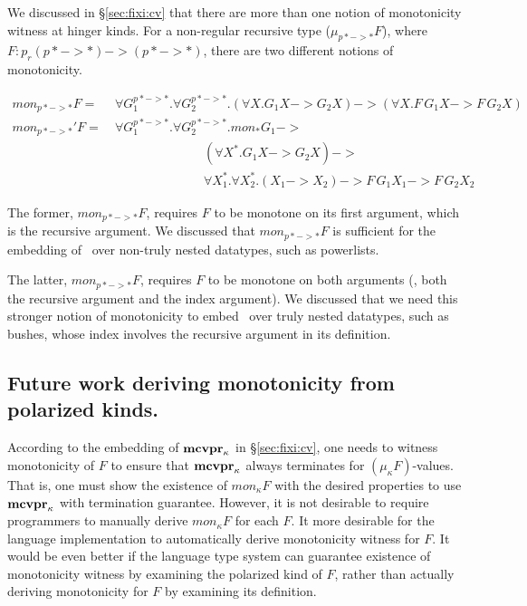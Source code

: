 We discussed in \S\ref{sec:fixi:cv} that there are more than one notion of
monotonicity witness at hinger kinds. For a non-regular recursive type
($\mu_{p* -> *} F$), where $F : p_r(p* -> *) -> (p* -> *)$, there are
two different notions of monotonicity.\vspace*{-1.5em}
\begin{singlespace}
\begin{align*}
\textit{mon}_{p* -> *}F =~&
	\forall G_1^{p* -> *}.\forall G_2^{p* -> *}.
	(\forall X. G_1 X -> G_2 X) -> (\forall X.F\,G_1 X -> F\,G_2 X)
	\\[1mm]
\textit{mon}_{p* -> *}'F =~&
	\forall G_1^{p* -> *}.\forall G_2^{p* -> *}.
		mon_{*} G_1 -> \\ & \qquad\qquad\qquad\quad
		(\forall X^{*}. G_1 X -> G_2 X) -> \\ & \qquad\qquad\qquad\quad
		\forall X_1^{*}.\forall X_2^{*}.
		(X_1 -> X_2) -> F\,G_1 X_1 -> F\,G_2 X_2
\end{align*}
\end{singlespace}
The former, $\textit{mon}_{p* -> *}F$, requires $F$ to be monotone
on its first argument, which is the recursive argument.
We discussed that $\textit{mon}_{p* -> *}F$ is sufficient
for the embedding of \McvPr\ over non-truly nested datatypes,
such as powerlists.

The latter, $\textit{mon}_{p* -> *}F$, requires $F$ to be monotone
on both arguments (\ie, both the recursive argument and the index argument).
We discussed that we need this stronger notion of monotonicity
to embed \McvPr\ over truly nested datatypes, such as bushes,
whose index involves the recursive argument in its definition.

\subsection*{Future work deriving monotonicity from polarized kinds.}
According to the embedding of $\mathbf{mcvpr}_\kappa$ in \S\ref{sec:fixi:cv},
one needs to witness monotonicity of $F$ to ensure that $\mathbf{mcvpr}_\kappa$
always terminates for $(\mu_\kappa F)$-values. That is, one must show
the existence of $mon_{\kappa}F$ with the desired properties to use
$\mathbf{mcvpr}_\kappa$ with termination guarantee. However, it is not desirable
to require programmers to manually derive $mon_{\kappa}F$ for each $F$.
It more desirable for the language implementation to automatically
derive monotonicity witness for $F$. It would be even better if
the language type system can guarantee existence of monotonicity witness
by examining the polarized kind of $F$, rather than actually deriving
monotonicity for $F$ by examining its definition.

